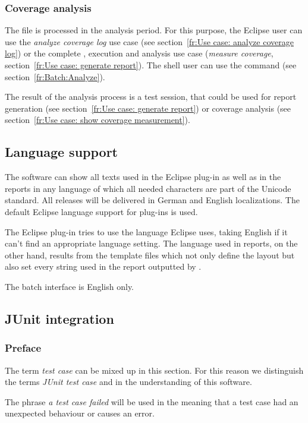 \subsubsection{Coverage analysis}
The  file is processed in the analysis period. For this purpose, the Eclipse user can use the \textit{analyze coverage log} use case (see section~\ref{fr:Use case: analyze coverage log}) or the complete , execution and analysis use case (\textit{measure coverage}, section~\ref{fr:Use case: generate report}). The shell user can use the command  (see section~\ref{fr:Batch:Analyze}).
\par
The result of the analysis process is a test session, that could be used for report generation (see section~\ref{fr:Use case: generate report}) or coverage analysis (see section~\ref{fr:Use case: show coverage measurement}).

\subsection{Language support} \label{fr:Language support}
The software can show all texts used in the Eclipse plug-in as well as in the reports in any language of which all needed characters are part of the Unicode standard. All releases will be delivered in German and English localizations. The default Eclipse language support for plug-ins is used.
\par
The Eclipse plug-in tries to use the language Eclipse uses, taking English if it can't find an appropriate language setting. The language used in reports, on the other hand, results from the template files which not only define the layout but also set every string used in the report outputted by \gbt.
\par
The batch interface is English only.

\subsection{JUnit integration} \label{fr:JUnit integration} 
\subsubsection{Preface}
The term \textit{test case} can be mixed up in this section. For this reason we distinguish the terms \textit{JUnit test case} and  in the understanding of this software.
\par
The phrase \textit{a test case failed} will be used in the meaning that a test case had an unexpected behaviour or causes an error.

